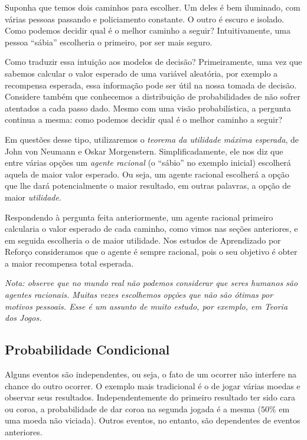 \documentclass{article}
\begin{document}
            Suponha que temos dois caminhos para escolher.
            Um deles é bem iluminado, com várias pessoas passando e policiamento constante.
            O outro é escuro e isolado.
            Como podemos decidir qual é o melhor caminho a seguir?
            Intuitivamente, uma pessoa ``sábia'' escolheria o primeiro, por ser mais seguro.

            Como traduzir essa intuição aos modelos de decisão?
            Primeiramente, uma vez que sabemos calcular o valor esperado de uma variável aleatória, por exemplo a recompensa esperada, essa informação pode ser útil na nossa tomada de decisão.
            Considere também que conhecemos a distribuição de probabilidades de não sofrer atentados a cada passo dado.
            Mesmo com uma visão probabilística, a pergunta continua a mesma: como podemos decidir qual é o melhor caminho a seguir?

            Em questões desse tipo, utilizaremos o \emph{teorema da utilidade máxima esperada}, de John von Neumann e Oskar Morgenstern.
            Simplificadamente, ele nos diz que entre várias opções um \emph{agente racional} (o ``sábio'' no exemplo inicial) escolherá aquela de maior valor esperado.
            Ou seja, um agente racional escolherá a opção que lhe dará potencialmente o maior resultado, em outras palavras, a opção de maior \emph{utilidade}. 
            
            Respondendo à pergunta feita anteriormente, um agente racional primeiro calcularia o valor esperado de cada caminho, como vimos nas seções anteriores, e em seguida escolheria o de maior utilidade.
            Nos estudos de Aprendizado por Reforço consideramos que o agente é sempre racional, pois o seu objetivo é obter a maior recompensa total esperada.
            
            \emph{Nota: observe que no mundo real não podemos considerar que seres humanos são agentes racionais. Muitas vezes escolhemos opções que não são ótimas por motivos pessoais. Esse é um assunto de muito estudo, por exemplo, em \emph{Teoria dos Jogos}.}
            
        \subsection{Probabilidade Condicional}
        
            Alguns eventos são independentes, ou seja, o fato de um ocorrer não interfere na chance do outro ocorrer.
            O exemplo mais tradicional é o de jogar várias moedas e observar seus resultados.
            Independentemente do primeiro resultado ter sido cara ou coroa, a probabilidade de dar coroa na segunda jogada é a mesma ($50\%$ em uma moeda não viciada).
            Outros eventos, no entanto, são dependentes de eventos anteriores.
            
\end{document}
